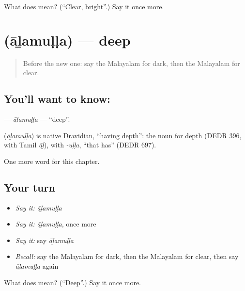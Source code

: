 \begin{tcolorbox}[breakable,colback=teal!4,colframe=teal!35!black,title={Before you move on}]
What does  mean? (\textquotedblleft{}Clear, bright\textquotedblright{}.) Say it once more.
\end{tcolorbox}
\section[\texorpdfstring{\ml{ആഴമുള്ള} (āḻamuḷḷa)}{ആഴമുള്ള (āḻamuḷḷa)}]{ (āḻamuḷḷa) — deep}

\label{lesson:ML-C167-alamulla}



\begin{quote}
Before the new one: say the Malayalam for dark, then the Malayalam for clear.
\end{quote}

\subsection*{You'll want to know: }
\textbf{} — \emph{āḻamuḷḷa} — \textquotedblleft{}deep\textquotedblright{}.

\begin{cousinweb}
\textbf{} (\emph{āḻamuḷḷa}) is native Dravidian, \textquotedblleft{}having depth\textquotedblright{}: the noun for depth (DEDR 396, with Tamil \emph{āḻ}), with \emph{-uḷḷa}, \textquotedblleft{}that has\textquotedblright{} (DEDR 697).
\end{cousinweb}

\begin{grammarlens}[title={What you've built}]
One more word for this chapter.
\end{grammarlens}

\subsection*{Your turn}
\begin{itemize}
\raggedright
  \item \emph{Say it:} \emph{āḻamuḷḷa}
  \item \emph{Say it:} \emph{āḻamuḷḷa}, once more
  \item \emph{Say it:} say \emph{āḻamuḷḷa}
  \item \emph{Recall:} say the Malayalam for dark, then the Malayalam for clear, then say \emph{āḻamuḷḷa} again
\end{itemize}

\begin{tcolorbox}[breakable,colback=teal!4,colframe=teal!35!black,title={Before you move on}]
What does  mean? (\textquotedblleft{}Deep\textquotedblright{}.) Say it once more.
\end{tcolorbox}
